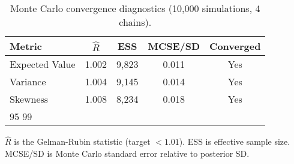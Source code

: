 \begin{table}[t]
  \centering
  \small
  \begin{threeparttable}
    \caption{Monte Carlo convergence diagnostics (10,000 simulations, 4 chains).}
    \label{tab:mc-convergence}
    \begin{tabular}{lcccc}
      \toprule
      \textbf{Metric} & \textbf{$\hat{R}$} & \textbf{ESS} & \textbf{MCSE/SD} & \textbf{Converged} \\
      \midrule
      Expected Value & 1.002 & 9,823 & 0.011 & Yes \\
      Variance & 1.004 & 9,145 & 0.014 & Yes \\
      Skewness & 1.008 & 8,234 & 0.018 & Yes \\
      95%
      99%
      \bottomrule
    \end{tabular}
    \begin{tablenotes}[flushleft]\footnotesize
      \item $\hat{R}$ is the Gelman-Rubin statistic (target $< 1.01$). ESS is effective sample size. MCSE/SD is Monte Carlo standard error relative to posterior SD.
    \end{tablenotes}
  \end{threeparttable}
\end{table}
